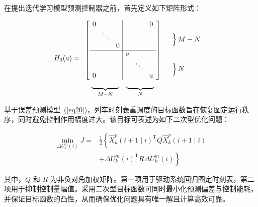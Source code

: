 在提出迭代学习模型预测控制器之前，首先定义如下矩阵形式：

\begin{equation*}
    H_{3}(a)=
    \begin{array}{ccccccccccc}
    \setlength{\arraycolsep}{1.5mm}
        \left[
        \begin{array}{ccc|ccc}
           0& & & & & 0 \\
           & \ddots& & & & \\
            &  & 0& & & \\ 
            \cline{1-6}
           & & &a& & \\
            & & & &\ddots& \\
           0& & & & &a\\
        \end{array}
        \right]
        &
        \begin{array}{c}
        	 \\
             \left.\rule{0mm}{3.5mm}\right\}M-N  \\ \hfill
             \\
             \\\left.\rule{0mm}{3.5mm}\right\}N \hfill
             \\
        \end{array} \\
        \begin{array}{cc}
            \underbrace{\rule{14mm}{0mm}}_{M-N}&  
            \underbrace{\rule{14mm}{0mm}}_{N}
        \end{array}
    \end{array}
\end{equation*}

基于误差预测模型~(\ref{eq20})，列车时刻表重调度的目标函数旨在恢复图定运行秩序，同时避免控制作用幅度过大。该目标可表述为如下二次型优化问题：

\begin{equation}
\begin{aligned}
\min _{\Delta U_k^m(i)} J= & \frac{1}{2}\left\{ \hat{X}_k^p(i+1 \mid i)^{\mathrm{T}} Q \hat{X}_k^p(i+1 \mid i) \right. \\
& \left. + \Delta U_k^m(i)^{\mathrm{T}} R \Delta U_k^m(i) \right\}
\end{aligned}
\label{eq21}
\end{equation}

其中，$Q$ 和 $R$ 为非负对角加权矩阵。第一项用于驱动系统回归图定时刻表，第二项用于抑制控制量幅值。采用二次型目标函数可同时最小化预测偏差与控制能耗，并保证目标函数的凸性，从而确保优化问题具有唯一解且计算高效可靠。


